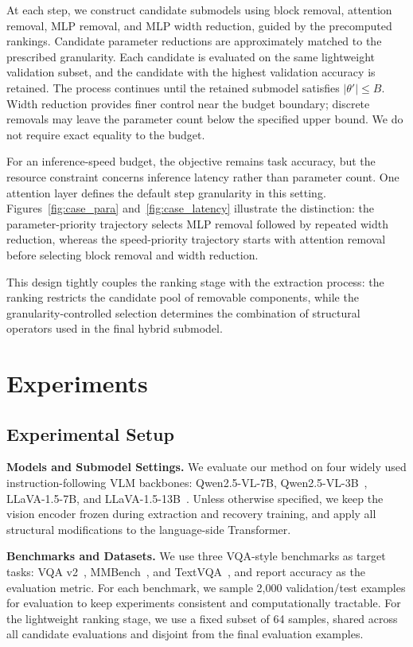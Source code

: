 \documentclass[11pt]{article}
\begin{document}
At each step, we construct candidate submodels using block removal, attention removal, MLP removal, and MLP width reduction, guided by the precomputed rankings. Candidate parameter reductions are approximately matched to the prescribed granularity. Each candidate is evaluated on the same lightweight validation subset, and the candidate with the highest validation accuracy is retained. The process continues until the retained submodel satisfies $|\theta'|\le B$. Width reduction provides finer control near the budget boundary; discrete removals may leave the parameter count below the specified upper bound. We do not require exact equality to the budget.

For an inference-speed budget, the objective remains task accuracy, but the resource constraint concerns inference latency rather than parameter count. One attention layer defines the default step granularity in this setting. Figures~\ref{fig:case_para} and~\ref{fig:case_latency} illustrate the distinction: the parameter-priority trajectory selects MLP removal followed by repeated width reduction, whereas the speed-priority trajectory starts with attention removal before selecting block removal and width reduction.

This design tightly couples the ranking stage with the extraction process: the ranking restricts the candidate pool of removable components, while the granularity-controlled selection determines the combination of structural operators used in the final hybrid submodel.


\section{Experiments}

\subsection{Experimental Setup}

\textbf{Models and Submodel Settings.}
We evaluate our method on four widely used instruction-following VLM backbones:
Qwen2.5-VL-7B, Qwen2.5-VL-3B~\cite{xu2025qwen25vltechnicalreport}, LLaVA-1.5-7B, and LLaVA-1.5-13B~\cite{liu2023visual}.
Unless otherwise specified, we keep the vision encoder frozen during extraction and recovery training, and apply all structural modifications to the language-side Transformer.

\textbf{Benchmarks and Datasets.}
We use three VQA-style benchmarks as target tasks: VQA v2~\cite{goyal2017making}, MMBench~\cite{liu2024mmbench}, and TextVQA~\cite{singh2019towards}, and report accuracy as the evaluation metric.
For each benchmark, we sample 2,000 validation/test examples for evaluation to keep experiments consistent and computationally tractable.
For the lightweight ranking stage, we use a fixed subset of 64 samples, shared across all candidate evaluations and disjoint from the final evaluation examples.
\end{document}
